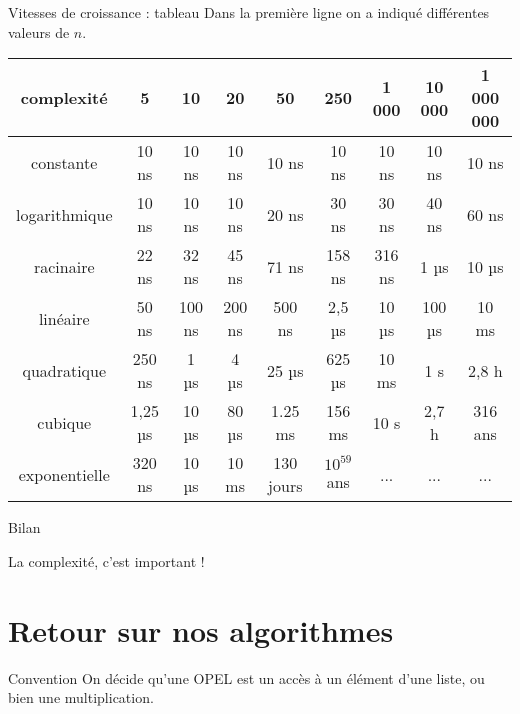 \documentclass[12pt]{beamer}
\begin{document}
\begin{frame}{Vitesses de croissance : tableau}
Dans la première ligne on a indiqué différentes valeurs de $n$.
\tiny
\renewcommand{\arraystretch}{1.7}
\begin{center}
\begin{tabular}{|c|c|c|c|c|c|c|c|c|}
\hline
\rowcolor{beamerRed}\textbf{\color{white}complexité} & \textbf{\color{white}5} & \textbf{\color{white}10} & \textbf{\color{white}20} & \textbf{\color{white}50} & \textbf{\color{white}250} & \textbf{\color{white}1 000} & \textbf{\color{white}10 000} & \textbf{\color{white}1 000 000} \\
\hline
constante & 10 ns & 10 ns & 10 ns & 10 ns & 10 ns & 10 ns & 10 ns & 10 ns \\
\hline
\rowcolor{blue!10}logarithmique & 10 ns & 10 ns & 10 ns & 20 ns  & 30 ns & 30 ns & 40 ns & 60 ns \\
\hline
racinaire & 22 ns & 32 ns & 45 ns & 71 ns & 158 ns & 316 ns & 1 µs & 10 µs \\
\hline
\rowcolor{blue!10}linéaire & 50 ns & 100 ns & 200 ns & 500 ns & 2,5 µs & 10 µs & 100 µs & 10 ms \\
\hline
quadratique & 250 ns & 1 µs & 4 µs & 25 µs & 625 µs & 10 ms & 1 s & 2,8 h \\
\hline
\rowcolor{blue!10}cubique & 1,25 µs & 10 µs & 80 µs & 1.25 ms & 156 ms & 10 s & 2,7 h & 316 ans \\
\hline
exponentielle & 320 ns & 10 µs & 10 ms & 130 jours & $10^{59}$ ans & ... & ... & ... \\
\hline
\end{tabular}
\end{center}
\end{frame}

\begin{frame}{Bilan}
\Huge 
\begin{center}
La complexité,
c'est important !
\end{center}
\end{frame}

\section*{Retour sur nos algorithmes}

\begin{frame}{Convention}
On décide qu'une \textsc{OPEL} est un accès à un élément d'une liste, ou bien une multiplication.
\end{frame}
\end{document}

